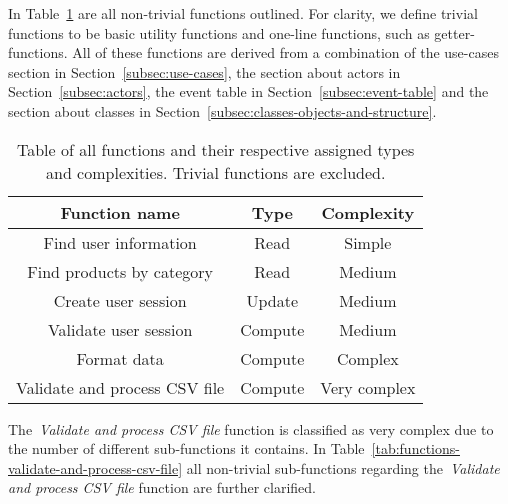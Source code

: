 In Table~\ref{tab:functions} are all non-trivial functions outlined.
For clarity, we define trivial functions to be basic utility functions and one-line functions, such as getter-functions.
All of these functions are derived from a combination of the use-cases section in Section~\ref{subsec:use-cases},
the section about actors in Section~\ref{subsec:actors}, the event table in Section~\ref{subsec:event-table} and the
section about classes in Section~\ref{subsec:classes-objects-and-structure}.

\begin{table}[h]
    \centering
    \begin{tabular}{ccc}
        \toprule
        \textbf{Function name}
        & \textbf{Type}
        & \textbf{Complexity}
        \\ \midrule
        Find user information
        & Read
        & Simple
        \\ \midrule
        Find products by category
        & Read
        & Medium
        \\ \midrule
        Create user session
        & Update
        & Medium
        \\ \midrule
        Validate user session
        & Compute
        & Medium
        \\ \midrule
        Format data
        & Compute
        & Complex
        \\ \midrule
        Validate and process CSV file
        & Compute
        & Very complex
        \\ \bottomrule
    \end{tabular}%
    \caption{Table of all functions and their respective assigned types and complexities.
    Trivial functions are excluded.
    }\label{tab:functions}
\end{table}

The~\textit{Validate and process CSV file} function is classified as very complex due to the number of different
sub-functions it contains.
In Table~\ref{tab:functions-validate-and-process-csv-file} all non-trivial sub-functions regarding
the~\textit{Validate and process CSV file} function are further clarified.

